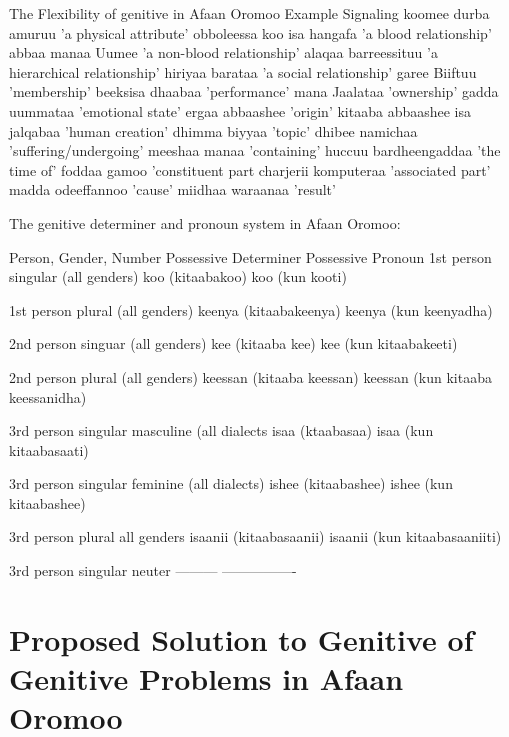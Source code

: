 \documentclass[11pt,a4paper]{article}
\begin{document}
	The Flexibility of genitive in Afaan Oromoo
	Example                           Signaling
	koomee durba amuruu               'a physical attribute'
	obboleessa koo isa hangafa        'a blood relationship'
	abbaa manaa Uumee                'a non-blood relationship'
	alaqaa barreessituu              'a hierarchical relationship'
	hiriyaa barataa                  'a social relationship'
	garee Biiftuu                    'membership'
	beeksisa dhaabaa                 'performance'
	mana Jaalataa                    'ownership'
	gadda uummataa                   'emotional state'
	ergaa abbaashee                  'origin'
	kitaaba abbaashee isa jalqabaa   'human creation'
	dhimma biyyaa                   'topic'
	dhibee namichaa                'suffering/undergoing'
	meeshaa manaa                  'containing'
	huccuu bardheengaddaa          'the time of'
	foddaa gamoo                   'constituent part
	charjerii komputeraa           'associated part'
	madda odeeffannoo              'cause'
	miidhaa waraanaa               'result'
	
	
	The genitive determiner and pronoun system in Afaan Oromoo:
	
	Person, Gender, Number           Possessive Determiner             Possessive Pronoun
	1st person singular
	(all genders)                    koo (kitaabakoo)                       koo (kun kooti)
	
	1st person plural
	(all genders)                    keenya (kitaabakeenya)                keenya (kun keenyadha)
	
	2nd person singuar
	(all genders)                   kee (kitaaba kee)                     kee (kun  kitaabakeeti)
	
	2nd person plural
	(all genders)                  keessan (kitaaba keessan)              keessan (kun kitaaba keessanidha)
	
	3rd person singular
	masculine
	(all dialects                 isaa (ktaabasaa)                        isaa (kun kitaabasaati)
	
	3rd person singular
	feminine
	(all dialects)             ishee (kitaabashee)                       ishee (kun kitaabashee)
	
	3rd person plural
	all genders               isaanii (kitaabasaanii)                    isaanii (kun kitaabasaaniiti)
	
	3rd person singular
	neuter                    ---------                                 ----------------
	
	\section{Proposed Solution to Genitive of Genitive Problems in Afaan Oromoo}
	
\end{document}
